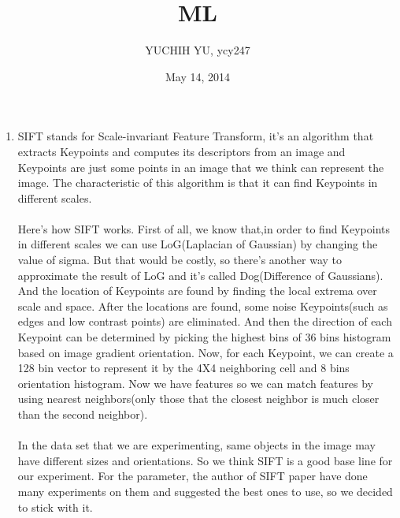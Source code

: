 \documentclass{article}
\title {ML}
\date{May 14, 2014}
\author{YUCHIH YU, ycy247}
\begin{document}
\maketitle
	\begin{enumerate}
		\item 
		SIFT stands for Scale-invariant Feature Transform, it's an algorithm that extracts Keypoints and computes its descriptors from an image and Keypoints are just some points in an image that we think can represent the image. The characteristic of this algorithm is that it can find Keypoints in different scales.\\\\
		Here's how SIFT works. First of all, we know that,in order to find Keypoints in different scales we can use LoG(Laplacian of Gaussian) by changing the value of sigma. But that would be costly, so there's another way to approximate the result of LoG and it's called Dog(Difference of Gaussians). And the location of Keypoints are found by finding the local extrema over scale and space. After the locations are found, some noise Keypoints(such as edges and low contrast points) are eliminated. And then the direction of each Keypoint can be determined by picking the highest
		bins of 36 bins histogram based on image gradient orientation. Now, for each Keypoint, we can create a 128 bin vector to represent it by the 4X4 neighboring cell and 8 bins orientation histogram. Now we have features so we can match features by using nearest neighbors(only those that the closest neighbor is much closer than the second neighbor).\\\\
		In the data set that we are experimenting, same objects in the image may have different sizes and orientations. So we think SIFT is a good base line for our experiment. For the parameter, the author of SIFT paper have done many experiments on them and suggested the best ones to use, so we decided to stick with it.
	\end{enumerate}

	
\end{document}
